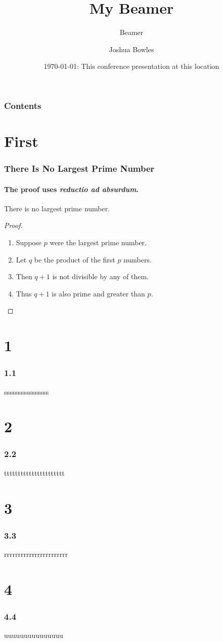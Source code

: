 \documentclass[hyperref={pdfpagelabels=false},pdfauthor={true},%
]{beamer}
\begin{document}
\title{My Beamer}
\author[Bowles]{Joshua Bowles}
\date{\today: This conference presentation at this location}
\subtitle{Beamer}


\begin{frame}
\titlepage
\end{frame}

\begin{frame}\frametitle{Contents}\tableofcontents
\end{frame}

\section{First}
\frame{\tableofcontents[currentsection]}
\begin{frame}
\frametitle{There Is No Largest Prime Number}
\framesubtitle{The proof uses \textit{reductio ad absurdum}.}
\begin{theorem}
There is no largest prime number.
\end{theorem}
\begin{proof}
\begin{enumerate}
\item<1-> Suppose $p$ were the largest prime number.
\item<2-> Let $q$ be the product of the first $p$ numbers.
\item<3-> Then $q + 1$ is not divisible by any of them.
\item<1-> Thus $q + 1$ is also prime and greater than $p$.\qedhere
\end{enumerate}
\end{proof}
\end{frame}

\section{1}
\begin{frame}\frametitle{1.1}
ssssssssssssssss
\end{frame}

\section{2}
\begin{frame}\frametitle{2.2}
tttttttttttttttttttttt
\end{frame}

\section{3}
\begin{frame}\frametitle{3.3}
rrrrrrrrrrrrrrrrrrrrrrr
\end{frame}

\section{4}
\begin{frame}\frametitle{4.4}
uuuuuuuuuuuuuuu
\end{frame}
\end{document}
